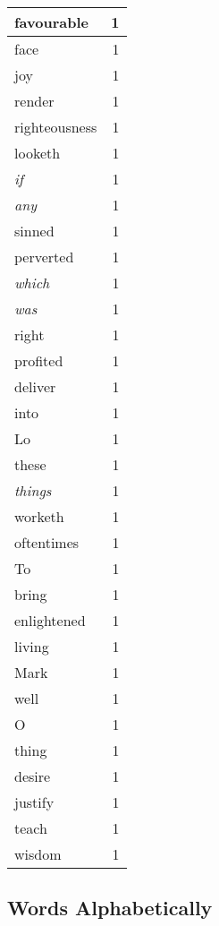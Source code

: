 \begin{center}
\begin{longtable}{l|r}
favourable & 1 \\ \hline
face & 1 \\ \hline
joy & 1 \\ \hline
render & 1 \\ \hline
righteousness & 1 \\ \hline
looketh & 1 \\ \hline
\emph{if} & 1 \\ \hline
\emph{any} & 1 \\ \hline
sinned & 1 \\ \hline
perverted & 1 \\ \hline
\emph{which} & 1 \\ \hline
\emph{was} & 1 \\ \hline
right & 1 \\ \hline
profited & 1 \\ \hline
deliver & 1 \\ \hline
into & 1 \\ \hline
Lo & 1 \\ \hline
these & 1 \\ \hline
\emph{things} & 1 \\ \hline
worketh & 1 \\ \hline
oftentimes & 1 \\ \hline
To & 1 \\ \hline
bring & 1 \\ \hline
enlightened & 1 \\ \hline
living & 1 \\ \hline
Mark & 1 \\ \hline
well & 1 \\ \hline
O & 1 \\ \hline
thing & 1 \\ \hline
desire & 1 \\ \hline
justify & 1 \\ \hline
teach & 1 \\ \hline
wisdom & 1 \\ \hline
\end{longtable}
\end{center}



\normalsize



\subsection{Words Alphabetically}

